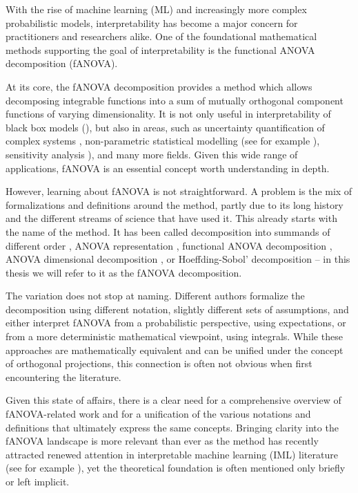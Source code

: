 With the rise of machine learning (ML) and increasingly more complex probabilistic models, interpretability has become a major concern for practitioners and researchers alike. One of the foundational mathematical methods supporting the goal of interpretability is the functional ANOVA decomposition (fANOVA).

At its core, the fANOVA decomposition provides a method which allows decomposing integrable functions into a sum of mutually orthogonal component functions of varying dimensionality.
It is not only useful in interpretability of black box models (\cite{hooker2004, molnar2025}), but also in areas, such as uncertainty quantification of complex systems \cite{rahman2014}, non-parametric statistical modelling (see for example \cite{stone1997}), sensitivity analysis \cite{sobol1993sensitivity}), and many more fields.
Given this wide range of applications, fANOVA is an essential concept worth understanding in depth.\par

However, learning about fANOVA is not straightforward.
A problem is the mix of formalizations and definitions around the method, partly due to its long history and the different streams of science that have used it.
This already starts with the name of the method. It has been called decomposition into summands of different order \citep{sobol1993sensitivity}, ANOVA representation \citep{sobol2001}, functional ANOVA decomposition \citep{hooker2004}, ANOVA dimensional decomposition \citep{rahman2014}, or Hoeffding-Sobol' decomposition \citep{chastaing2012} – in this thesis we will refer to it as the fANOVA decomposition.\par
The variation does not stop at naming. Different authors formalize the decomposition using different notation, slightly different sets of assumptions, and either interpret fANOVA from a probabilistic perspective, using expectations, or from a more deterministic mathematical viewpoint, using integrals.
While these approaches are mathematically equivalent and can be unified under the concept of orthogonal projections, this connection is often not obvious when first encountering the literature.\par


Given this state of affairs, there is a clear need for a comprehensive overview of fANOVA-related work and for a unification of the various notations and definitions that ultimately express the same concepts.
Bringing clarity into the fANOVA landscape is more relevant than ever as the method has recently attracted renewed attention in interpretable machine learning (IML) literature (see for example \cite{hu2025}), yet the theoretical foundation is often mentioned only briefly or left implicit.\par

